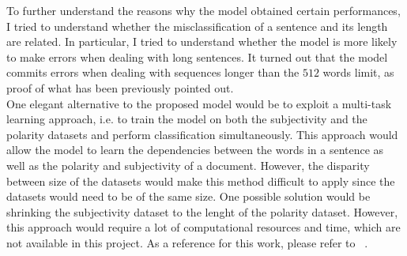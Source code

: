 To further understand the reasons why the model obtained certain performances, I tried to understand whether the misclassification of a sentence and its length are related. 
In particular, I tried to understand whether the model is more likely to make errors when dealing with long sentences. It turned out that the model
commits errors when dealing with sequences longer than the $512$ words limit, as proof of what has been previously pointed out.\\
One elegant alternative to the proposed model would be to exploit a multi-task learning approach, i.e. to train the model on both the subjectivity and the polarity datasets 
and perform classification simultaneously. This approach would allow the model to learn the dependencies between the words in a sentence as well as the polarity and subjectivity
of a document. However, the disparity between size of the datasets would make this method difficult to apply since the datasets would need to be of the same size.
One possible solution would be shrinking the subjectivity dataset to the lenght of the polarity dataset. However, this approach would require a lot of 
computational resources and time, which are not available in this project. As a reference for this work, please refer to ~\cite{mtl}.\\
